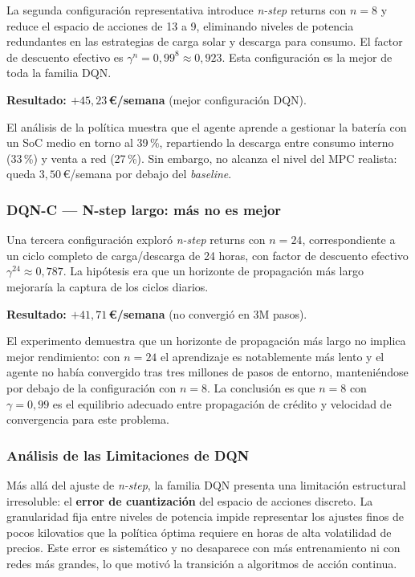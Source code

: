 \documentclass[12pt, a4paper, twoside]{report}
\begin{document}
La segunda configuración representativa introduce \textit{n-step} returns con
$n=8$ y reduce el espacio de acciones de 13 a 9, eliminando niveles de potencia
redundantes en las estrategias de carga solar y descarga para consumo. El factor
de descuento efectivo es $\gamma^n = 0{,}99^8 \approx 0{,}923$. Esta
configuración es la mejor de toda la familia DQN.

\textbf{Resultado: $+45{,}23$\,€/semana} (mejor configuración DQN).

El análisis de la política muestra que el agente aprende a gestionar la batería
con un SoC medio en torno al 39\,\%, repartiendo la descarga entre consumo
interno (33\,\%) y venta a red (27\,\%). Sin embargo, no alcanza el nivel del
MPC realista: queda $3{,}50$\,€/semana por debajo del \textit{baseline}.

\subsubsection{DQN-C — N-step largo: más no es mejor}

Una tercera configuración exploró \textit{n-step} returns con $n=24$,
correspondiente a un ciclo completo de carga/descarga de 24 horas, con factor
de descuento efectivo $\gamma^{24} \approx 0{,}787$. La hipótesis era que un
horizonte de propagación más largo mejoraría la captura de los ciclos diarios.

\textbf{Resultado: $+41{,}71$\,€/semana} (no convergió en 3M pasos).

El experimento demuestra que un horizonte de propagación más largo no implica
mejor rendimiento: con $n=24$ el aprendizaje es notablemente más lento y el
agente no había convergido tras tres millones de pasos de entorno,
manteniéndose por debajo de la configuración con $n=8$. La conclusión es que
$n=8$ con $\gamma = 0{,}99$ es el equilibrio adecuado entre propagación de
crédito y velocidad de convergencia para este problema.

\subsubsection{Análisis de las Limitaciones de DQN}

Más allá del ajuste de \textit{n-step}, la familia DQN presenta una limitación
estructural irresoluble: el \textbf{error de cuantización} del espacio de
acciones discreto. La granularidad fija entre niveles de potencia impide
representar los ajustes finos de pocos kilovatios que la política óptima
requiere en horas de alta volatilidad de precios. Este error es sistemático
y no desaparece con más entrenamiento ni con redes más grandes, lo que motivó
la transición a algoritmos de acción continua.
\end{document}
